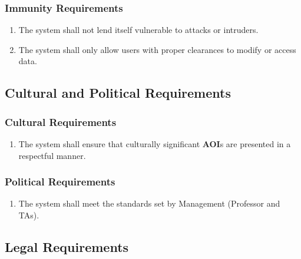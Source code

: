 \documentclass[titlepage]{article}
\newcounter{req}
\begin{document}
		\subsubsection{Immunity Requirements}
		\label{ssub:immunity_requirements}
		\begin{enumerate}[{SR}1. ]
		\setcounter{enumi}{\value{req}}
			\item 
			The system shall not lend itself vulnerable to attacks or intruders.
			\item
			The system shall only allow users with proper clearances to modify or access data.
		\setcounter{req}{\theenumi}
		\end{enumerate}
		
		
		\subsection{Cultural and Political Requirements}
		\setcounter{req}{0}
		\label{sub:cultural_and_political_requirements}
		
		\subsubsection{Cultural Requirements}
		\label{ssub:cultural_requirements}
		\begin{enumerate}[{CP}1. ]
		\setcounter{enumi}{\value{req}}
			\item
			The system shall ensure that culturally significant \textbf{AOI}s are presented in a respectful manner.
		\setcounter{req}{\theenumi}
		\end{enumerate}
		
		\subsubsection{Political Requirements}
		\label{ssub:political_requirements}
		\begin{enumerate}[{CP}1. ]
		\setcounter{enumi}{\value{req}}
			\item
			The system shall meet the standards set by Management (Professor and TAs).
		\setcounter{req}{\theenumi}
		\end{enumerate}
		
		\subsection{Legal Requirements}
		\setcounter{req}{0}
		\label{sub:legal_requirements}
		
\end{document}
